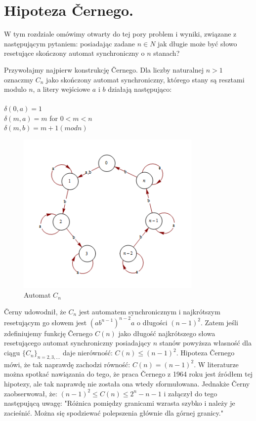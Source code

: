 \documentclass[12pt,a4paper]{article}
\begin{document}
\section{Hipoteza \v Cernego.}

W tym rozdziale om\'{o}wimy otwarty do tej pory problem i wyniki, zwi\k{a}zane z nast\k{e}puj\k{a}cym pytaniem: posiadaj\k{a}c zadane $n \in N$ jak d{\l}ugie mo\.ze by\'c s{\l}owo resetuj\k{a}ce sko\'nczony automat synchroniczny o $n$ stanach? 

Przywo{\l}ajmy najpierw konstrukcj\k{e} \v Cernego. Dla liczby naturalnej $n>1$ oznaczmy $C_{n}$ jako sko\'nczony automat synchroniczny, kt\'orego stany s\k{a} resztami modulo $n$, a litery wej\'sciowe $a$ i $b$ dzia{\l}aj\k{a} nast\k{e}puj\k{a}co:\\
\\
$\delta(0,a)=1$\\
$\delta(m,a)=m$ for $0<m<n$\\
$\delta(m,b)=m+1(modn)$
\begin{figure}[H]
    \centering
    \includegraphics[width=0.8\textwidth]{rysunek7}
    \caption{Automat $C_{n}$}
    \label{fig:rysunek7}
\end{figure}

\v Cerny udowodni{\l}, \.ze $C_{n}$ jest automatem synchronicznym i najkr\'otszym resetuj\k{a}cym go s{\l}owem jest $(ab^{n-1})^{n-2}a$ o d{\l}ugo\'sci $(n-1)^{2}$. Zatem je\'sli zdefiniujemy funkcj\k{e} \v Cernego $C(n)$ jako d{\l}ugo\'s\'c najkr\'otszego s{\l}owa resetuj\k{a}cego automat synchroniczny posiadaj\k{a}cy $n$ stan\'ow powy\.zsza w{\l}asno\'s\'c dla ci\k{a}gu $\{C_{n}\}_{n=2,3,\ldots}$ daje nier\'owno\'s\'c: $C(n)\leq(n-1)^{2}$. Hipoteza \v Cernego m\'owi, \.ze tak naprawd\k{e} zachodzi r\'owno\'s\'c: $C(n)=(n-1)^{2}$. W literaturze mo\.zna spotka\'c nawi\k{a}zania do tego, \.ze praca \v Cernego z 1964 roku jest \'zr\'od{\l}em tej hipotezy, ale tak naprawd\k{e} nie zosta{\l}a ona wtedy sformu{\l}owana. Jednak\.ze \v Cerny zaobserwowa{\l}, \.ze: $(n-1)^{2}\leq C(n)\leq2^{n}-n-1$ i za{\l}\k{a}czy{\l} do tego nast\k{e}puj\k{a}c\k{a} uwag\k{e}: "R\'o\.znica pomi\k{e}dzy granicami wzrasta szybko i nale\.zy je zacie\'sni\'c. Mo\.zna si\k{e} spodziewa\'c polepszenia g{\l}\'ownie dla g\'ornej granicy."
\end{document}
